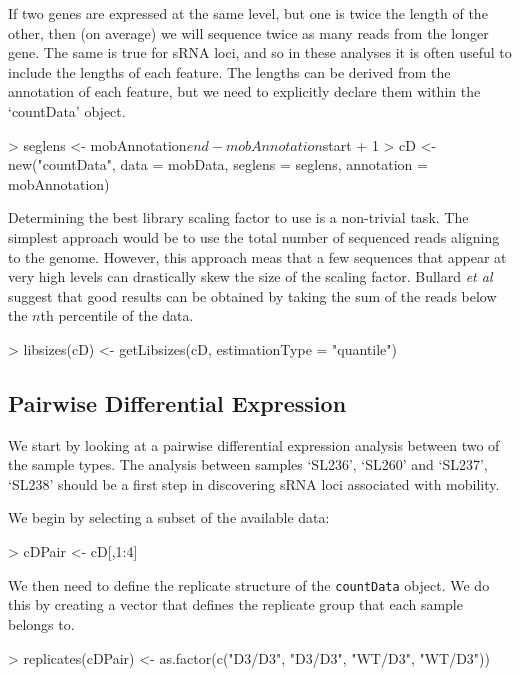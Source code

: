 \documentclass[a4paper]{article}
\begin{document}
\label{Section::seglen}

If two genes are expressed at the same level, but one is twice the length of the other, then (on average) we will sequence twice as many reads from the longer gene. The same is true for sRNA loci, and so in these analyses it is often useful to include the lengths of each feature. The lengths can be derived from the annotation of each feature, but we need to explicitly declare them within the `countData' object.

\begin{Schunk}
\begin{Sinput}
> seglens <- mobAnnotation$end - mobAnnotation$start + 1
> cD <- new("countData", data = mobData, seglens = seglens, annotation = mobAnnotation)
\end{Sinput}
\end{Schunk}

Determining the best library scaling factor to use is a non-trivial task. The simplest approach would be to use the total number of sequenced reads aligning to the genome. However, this approach meas that a few sequences that appear at very high levels can drastically skew the size of the scaling factor. Bullard \textsl{et al} suggest that good results can be obtained by taking the sum of the reads below the $n$th percentile of the data.
\begin{Schunk}
\begin{Sinput}
> libsizes(cD) <- getLibsizes(cD, estimationType = "quantile")
\end{Sinput}
\end{Schunk}

\subsection{Pairwise Differential Expression}

We start by looking at a pairwise differential expression analysis between two of the sample types. The analysis between samples `SL236', `SL260' and `SL237', `SL238' should be a first step in discovering sRNA loci associated with mobility. 

We begin by selecting a subset of the available data:
\begin{Schunk}
\begin{Sinput}
> cDPair <- cD[,1:4]
\end{Sinput}
\end{Schunk}

We then need to define the replicate structure of the \verb'countData' object. We do this by creating a vector that defines the replicate group that each sample belongs to.
\begin{Schunk}
\begin{Sinput}
> replicates(cDPair) <- as.factor(c("D3/D3", "D3/D3", "WT/D3", "WT/D3"))
\end{Sinput}
\end{Schunk}
\end{document}
